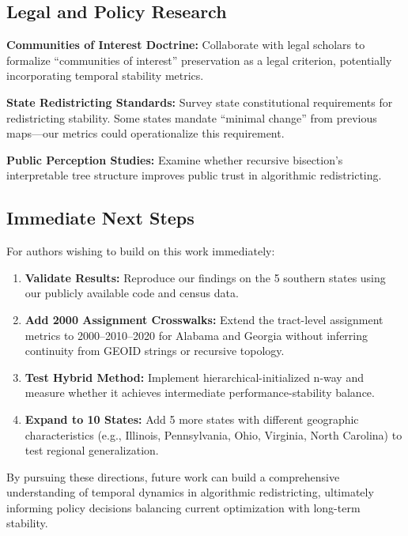 \subsection{Legal and Policy Research}

\textbf{Communities of Interest Doctrine:} Collaborate with legal scholars to formalize ``communities of interest'' preservation as a legal criterion, potentially incorporating temporal stability metrics.

\textbf{State Redistricting Standards:} Survey state constitutional requirements for redistricting stability. Some states mandate ``minimal change'' from previous maps—our metrics could operationalize this requirement.

\textbf{Public Perception Studies:} Examine whether recursive bisection's interpretable tree structure improves public trust in algorithmic redistricting.

\subsection{Immediate Next Steps}

For authors wishing to build on this work immediately:

\begin{enumerate}
    \item \textbf{Validate Results:} Reproduce our findings on the 5 southern states using our publicly available code and census data.

    \item \textbf{Add 2000 Assignment Crosswalks:} Extend the tract-level
    assignment metrics to 2000--2010--2020 for Alabama and Georgia without
    inferring continuity from GEOID strings or recursive topology.

    \item \textbf{Test Hybrid Method:} Implement hierarchical-initialized n-way and measure whether it achieves intermediate performance-stability balance.

    \item \textbf{Expand to 10 States:} Add 5 more states with different geographic characteristics (e.g., Illinois, Pennsylvania, Ohio, Virginia, North Carolina) to test regional generalization.
\end{enumerate}

By pursuing these directions, future work can build a comprehensive understanding of temporal dynamics in algorithmic redistricting, ultimately informing policy decisions balancing current optimization with long-term stability.
